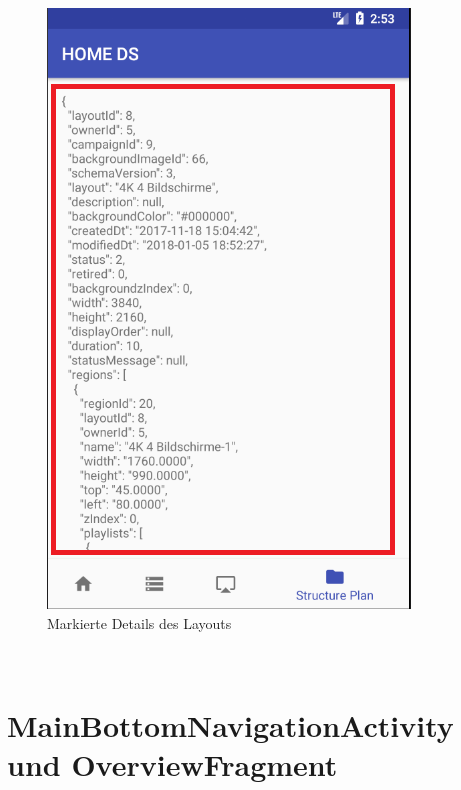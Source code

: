 \begin{figure}[H]
\centering
\includegraphics[scale=0.35]{images/06_AndroidApp/06_StructureDetail}
\caption{Markierte Details des Layouts}
\label{fig:mediaNav}
\end{figure}
\\
\section{MainBottomNavigationActivity und OverviewFragment}
